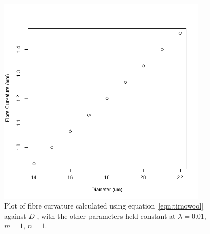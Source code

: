 %

\begin{figure}[!h]
  \centering
  \includegraphics[width=0.9\textwidth]{curvdia.png}
  \caption{Plot of fibre curvature calculated using equation~\ref{eqn:timowool} against $D$ , with the other parameters held constant at  $\lambda=0.01$, $m=1$,  $n=1$.}
  \label{fig:curvd}
\end{figure}

%

